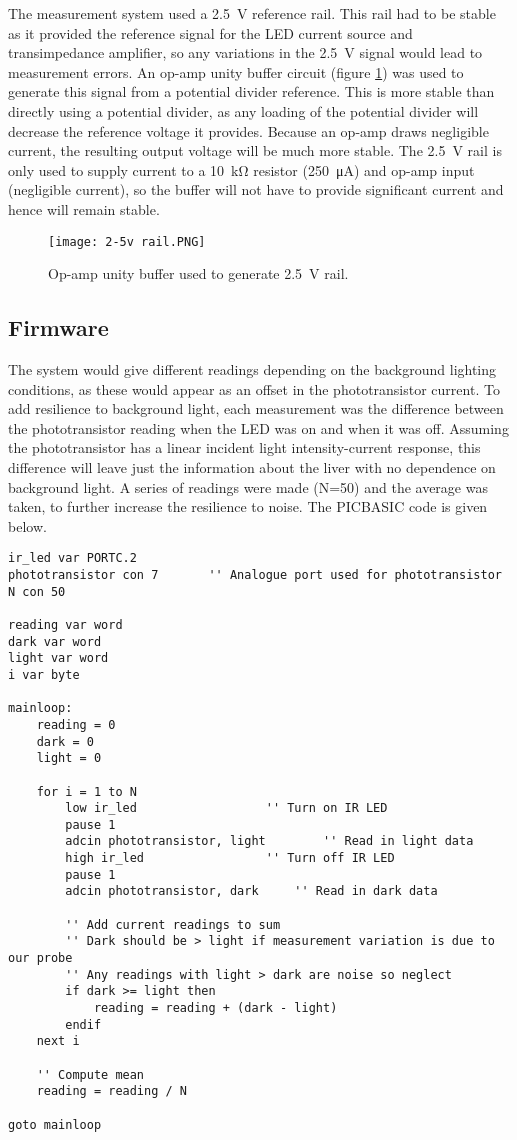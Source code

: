 The measurement system used a \SI{2.5}{\volt} reference rail. This rail had to be stable as it provided the reference signal for the LED current source and transimpedance amplifier, so any variations in the \SI{2.5}{\volt} signal would lead to measurement errors. An op-amp unity buffer circuit (figure \ref{fig: 2.5v rail}) was used to generate this signal from a potential divider reference. This is more stable than directly using a potential divider, as any loading of the potential divider will decrease the reference voltage it provides. Because an op-amp draws negligible current, the resulting output voltage will be much more stable. The \SI{2.5}{\volt} rail is only used to supply current to a \SI{10}{\kilo\ohm} resistor (\SI{250}{\micro\ampere}) and op-amp input (negligible current), so the buffer will not have to provide significant current and hence will remain stable.

\begin{figure}[ht]
	\centering
	\texttt{[image: 2-5v rail.PNG]}
	\caption{Op-amp unity buffer used to generate \SI{2.5}{\volt} rail.}
	\label{fig: 2.5v rail}
\end{figure}



\subsection{Firmware}
The system would give different readings depending on the background lighting conditions, as these would appear as an offset in the phototransistor current. To add resilience to background light, each measurement was the difference between the phototransistor reading when the LED was on and when it was off. Assuming the phototransistor has a linear incident light intensity-current response, this difference will leave just the information about the liver with no dependence on background light. A series of readings were made (N=50) and the average was taken, to further increase the resilience to noise. The PICBASIC code is given below.

\begin{lstlisting}
ir_led var PORTC.2
phototransistor con 7       '' Analogue port used for phototransistor
N con 50

reading var word
dark var word
light var word
i var byte

mainloop:
	reading = 0
	dark = 0
	light = 0
	
	for i = 1 to N
	    low ir_led					'' Turn on IR LED
	    pause 1
	    adcin phototransistor, light		'' Read in light data
	    high ir_led					'' Turn off IR LED
	    pause 1
	    adcin phototransistor, dark		'' Read in dark data
	    
	    '' Add current readings to sum
	    '' Dark should be > light if measurement variation is due to our probe
	    '' Any readings with light > dark are noise so neglect
	    if dark >= light then
	        reading = reading + (dark - light)
	    endif
	next i  
	
	'' Compute mean
	reading = reading / N

goto mainloop
\end{lstlisting}






